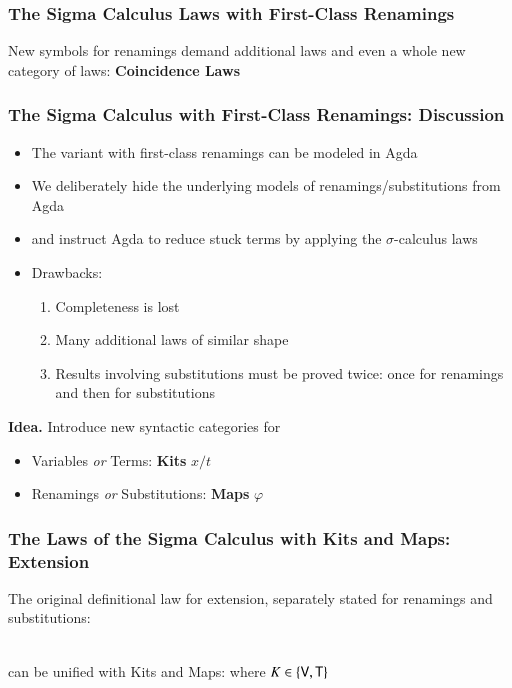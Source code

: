 \documentclass[dvipsnames,aspectratio=169,pdftex]{beamer}
\begin{document}
\begin{frame}[fragile]
  \frametitle{The Sigma Calculus Laws with First-Class Renamings}
  New symbols for renamings demand additional laws
  \EAssoc{}
  and even a whole new category of laws:
  \textbf{Coincidence Laws}
  \ECoincidenceLaw{}
\end{frame}

\begin{frame}[fragile]
  \frametitle{The Sigma Calculus with First-Class Renamings: Discussion}
  \begin{itemize}
    \item The variant with first-class renamings can be modeled in Agda
    \item We deliberately hide the underlying models of renamings/substitutions from Agda
    \item and instruct Agda to reduce stuck terms by applying the $\sigma$-calculus laws
    \item Drawbacks:
          \begin{enumerate}
            \item Completeness is lost
            \item Many additional laws of similar shape
            \item Results involving substitutions must be proved twice: once for renamings and
                  then for substitutions
          \end{enumerate}
  \end{itemize}

  \vspace{1em}
  \textbf{Idea.}
  Introduce new syntactic categories for
  \begin{itemize}
    \item Variables \emph{or} Terms: \textbf{Kits} $x/t$
    \item Renamings \emph{or} Substitutions: \textbf{Maps} $\varphi$
  \end{itemize}
\end{frame}

\begin{frame}[fragile]
  \frametitle{The Laws of the Sigma Calculus with Kits and Maps: Extension}
  The original definitional law for extension, separately stated for renamings and substitutions:
  \noindent\begin{minipage}[t]{0.48\linewidth}
    \raggedright{}
    \EDefLawsA{}
  \end{minipage}
  \hfill
  \begin{minipage}[t]{0.48\linewidth}
    \raggedright{}
    \EDefLawsB{}
  \end{minipage}\\
  can be unified with Kits and Maps:
  \EExtLaws{}
  where  $K \in \{\AgdaFunction{V}, \AgdaFunction{T}\}$
\end{frame}
\end{document}
